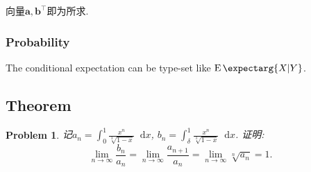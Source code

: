 \documentclass[a4paper, 12pt]{ctexart}
\theoremstyle{plain}
\newtheorem{problem}{Problem}[section]
\theoremstyle{plain}
\theoremstyle{plain}
\theoremstyle{nonumberplain}
\newcommand{\expect}{\operatorname{E}\expectarg}
\newcommand*{\diff}{\mathop{}\!\mathrm{d}}
\newcommand*{\vect}[1]{\bm{#1}}
\begin{document}
    向量$\vect{a}, \vect{b}^{\top}$即为所求.

    \subsubsection{Probability}

    The conditional expectation can be type-set like $\expect{X|Y}$.

    \subsection{Theorem}

    \begin{problem}
        记$\displaystyle a_n=\int_{0}^{1}{\frac{x^n}{\sqrt[3]{1-x}}\diff x}$,
        $\displaystyle b_n=\int_{\delta}^{1}{\frac{x^n}{\sqrt[3]{1-x}}\diff x}$.
        证明:
        \[\lim_{n\to \infty}{\frac{b_n}{a_n}}=
        \lim_{n\to \infty}{\frac{a_{n+1}}{a_n}}=
        \lim_{n\to \infty}{\sqrt[n]{a_n}}=1.\]
    \end{problem}
\end{document}

